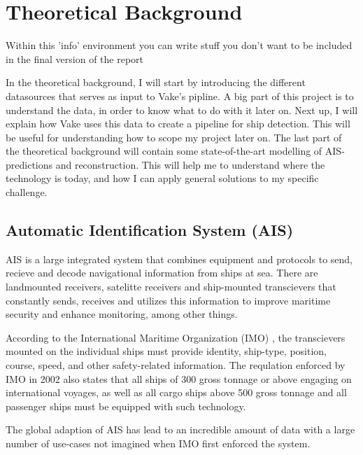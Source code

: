 \chapter{Theoretical Background}
\label{chp:theory}
\begin{info}
	Within this 'info' environment you can write stuff you don't want to be included in the final version of the report
\end{info}

In the theoretical background, I will start by introducing the different datasources that serves as input to Vake's pipline. A big part of this project is to understand the data, in order to know what to do with it later on.
Next up, I will explain how Vake uses this data to create a pipeline for ship detection. This will be useful for understanding how to scope my project later on. 
The last part of the theoretical background will contain some state-of-the-art modelling of AIS-predictions and reconstruction. This will help me to understand where the technology is today, and how I can apply general solutions to my specific challenge. 
\section{Automatic Identification System (AIS)}
\begin{info}{}
	
\end{info}
AIS is a large integrated system that combines equipment and protocols to send, recieve and decode navigational information from ships at sea. There are landmounted receivers, satelitte receivers and ship-mounted transcievers that constantly sends, receives and utilizes this information to improve maritime security and enhance monitoring, among other things.

According to the International Maritime Organization (IMO) \cite{MarineSafteyComittee}, the transcievers mounted on the individual ships must provide identity, ship-type, position, course, speed, and other safety-related information. 
The requlation enforced by IMO in 2002 also states that all ships of 300 gross tonnage or above engaging on international voyages, as well as all cargo ships above 500 gross tonnage and all passenger ships must be equipped with such technology. 

The global adaption of AIS has lead to an incredible amount of data with a large number of use-cases not imagined when IMO first enforced the system.   

